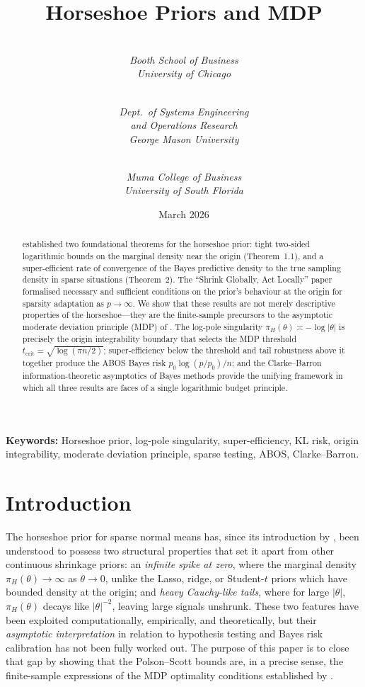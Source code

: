 \documentclass[12pt]{article}
\title{Horseshoe Priors and MDP}
\author{
	\makebox[.4\linewidth]{Nicholas G.\ Polson}\\\textit{Booth School of Business}\\\textit{University of Chicago}\\\and
	\makebox[.4\linewidth]{Vadim Sokolov}\\\textit{Dept.\ of Systems Engineering}\\\textit{and Operations Research}\\\textit{George Mason University}\\\and
	\makebox[.4\linewidth]{Daniel Zantedeschi}\\\textit{Muma College of Business}\\\textit{University of South Florida}
}
\date{March 2026}
\newcommand{\abs}[1]{\lvert #1 \rvert}
\newcommand{\piH}{\pi_H}
\newcommand{\tcrit}{t_{\mathrm{crit}}}
\begin{document}
\maketitle

\begin{abstract}
\citet{carvalho2010horseshoe} established two foundational theorems for the horseshoe prior: tight two-sided logarithmic bounds on the marginal density near the origin (Theorem~1.1), and a super-efficient rate of convergence of the Bayes predictive density to the true sampling density in sparse situations (Theorem~2). The ``Shrink Globally, Act Locally'' paper \citep{polson2010shrink} formalised necessary and sufficient conditions on the prior's behaviour at the origin for sparsity adaptation as $p \to \infty$. We show that these results are not merely descriptive properties of the horseshoe---they are the finite-sample precursors to the asymptotic moderate deviation principle (MDP) of \citet{datta2026newlook}. The log-pole singularity $\piH(\theta) \asymp -\log\abs{\theta}$ is precisely the origin integrability boundary that selects the MDP threshold $\tcrit = \sqrt{\log(\pi n/2)}$; super-efficiency below the threshold and tail robustness above it together produce the ABOS Bayes risk $p_0 \log(p/p_0)/n$; and the Clarke--Barron information-theoretic asymptotics of Bayes methods provide the unifying framework in which all three results are faces of a single logarithmic budget principle.
\end{abstract}

\noindent\textbf{Keywords:} Horseshoe prior, log-pole singularity, super-efficiency, KL risk, origin integrability, moderate deviation principle, sparse testing, ABOS, Clarke--Barron.

\section{Introduction}\label{sec:intro}

The horseshoe prior for sparse normal means has, since its introduction by \citet{carvalho2009handling}, been understood to possess two structural properties that set it apart from other continuous shrinkage priors: an \emph{infinite spike at zero}, where the marginal density $\piH(\theta) \to \infty$ as $\theta \to 0$, unlike the Lasso, ridge, or Student-$t$ priors which have bounded density at the origin; and \emph{heavy Cauchy-like tails}, where for large $\abs{\theta}$, $\piH(\theta)$ decays like $\abs{\theta}^{-2}$, leaving large signals unshrunk. These two features have been exploited computationally, empirically, and theoretically, but their \emph{asymptotic interpretation} in relation to hypothesis testing and Bayes risk calibration has not been fully worked out. The purpose of this paper is to close that gap by showing that the Polson--Scott bounds are, in a precise sense, the finite-sample expressions of the MDP optimality conditions established by \citet{datta2026newlook}.
\end{document}
